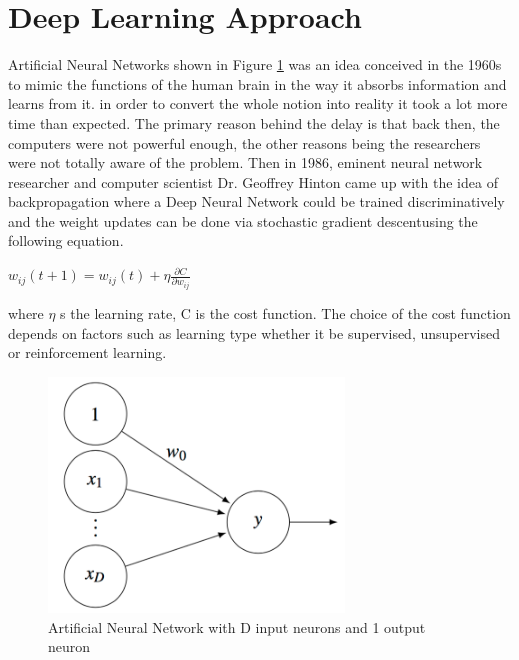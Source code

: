 \section{Deep Learning Approach} \label{sec:build4}

Artificial Neural Networks\cite{ANN} shown in Figure \ref{fig:Figure20} was an idea conceived  in the 1960s to mimic the functions of the human brain in the way it absorbs information and learns from it. in order to  convert the whole notion into reality it took a lot more time than expected. The primary reason behind the delay is that back then, the computers were not powerful enough, the other reasons being the researchers were not totally aware of the problem. Then in 1986, eminent neural network researcher and computer scientist Dr. Geoffrey Hinton came up with the idea of backpropagation\cite{backpropagation} where a Deep Neural Network could be trained discriminatively and the weight updates can be done via stochastic gradient descentusing the following equation.

\begin{center}
	$w_{ij}(t+1) = w_{ij}(t) + \eta \frac{\partial C}{\partial w_{ij}}$
\end{center}
where $\eta$ s the learning rate, C is the cost function. The choice of the cost function depends on factors such as learning type whether it be supervised, unsupervised or reinforcement learning. 

\begin{figure}[t]
	\begin{center}
		\includegraphics[width=0.7\textwidth]{Figures/Figure20}
	\end{center}
	\caption{Artificial Neural Network with D input neurons and 1 output neuron} 
	\label{fig:Figure20}
\end{figure}


